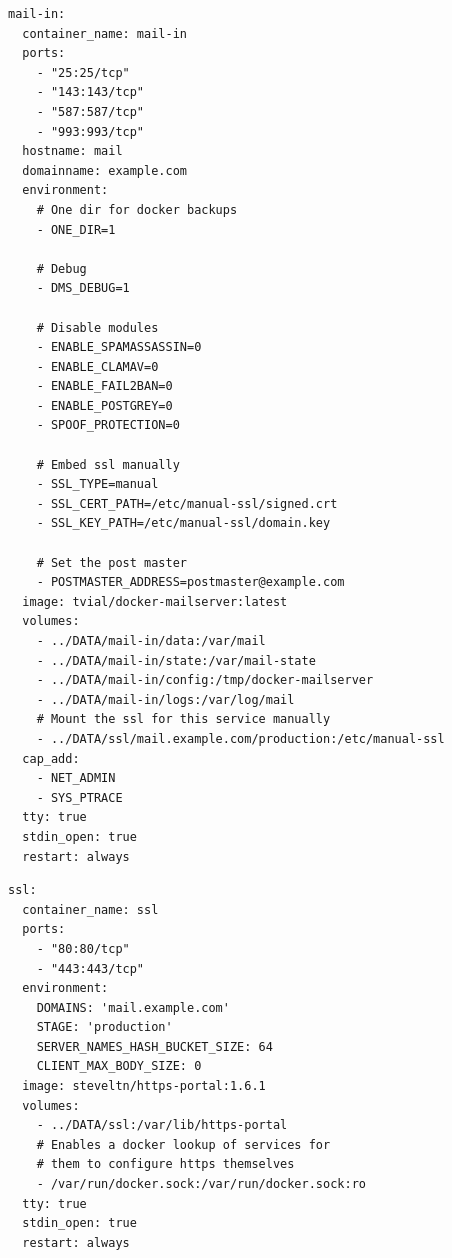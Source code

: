 \documentclass[a4paper,11pt,singlespacing]{article}
\begin{document}
\lstlistoflistings
\begin{lstlisting}[label={lst:Maileingangsserver},caption={Maileingangsserver}]
mail-in:
  container_name: mail-in
  ports:
    - "25:25/tcp"
    - "143:143/tcp"
    - "587:587/tcp"
    - "993:993/tcp"
  hostname: mail
  domainname: example.com
  environment:
    # One dir for docker backups
    - ONE_DIR=1
    
    # Debug
    - DMS_DEBUG=1
    
    # Disable modules
    - ENABLE_SPAMASSASSIN=0
    - ENABLE_CLAMAV=0
    - ENABLE_FAIL2BAN=0
    - ENABLE_POSTGREY=0
    - SPOOF_PROTECTION=0
    
    # Embed ssl manually
    - SSL_TYPE=manual
    - SSL_CERT_PATH=/etc/manual-ssl/signed.crt
    - SSL_KEY_PATH=/etc/manual-ssl/domain.key
    
    # Set the post master
    - POSTMASTER_ADDRESS=postmaster@example.com
  image: tvial/docker-mailserver:latest
  volumes:
    - ../DATA/mail-in/data:/var/mail
    - ../DATA/mail-in/state:/var/mail-state
    - ../DATA/mail-in/config:/tmp/docker-mailserver
    - ../DATA/mail-in/logs:/var/log/mail
    # Mount the ssl for this service manually
    - ../DATA/ssl/mail.example.com/production:/etc/manual-ssl
  cap_add:
    - NET_ADMIN
    - SYS_PTRACE
  tty: true
  stdin_open: true
  restart: always
\end{lstlisting}
	
\begin{lstlisting}[label={lst:SSL-Container},caption={SSL-Container}]
ssl:
  container_name: ssl
  ports:
    - "80:80/tcp"
    - "443:443/tcp"
  environment:
    DOMAINS: 'mail.example.com'
    STAGE: 'production'
    SERVER_NAMES_HASH_BUCKET_SIZE: 64
    CLIENT_MAX_BODY_SIZE: 0
  image: steveltn/https-portal:1.6.1
  volumes:
    - ../DATA/ssl:/var/lib/https-portal
    # Enables a docker lookup of services for
    # them to configure https themselves
    - /var/run/docker.sock:/var/run/docker.sock:ro
  tty: true
  stdin_open: true
  restart: always
\end{lstlisting}
	
\end{document}
